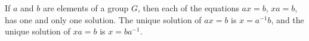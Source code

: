 If $a$ and $b$ are elements of a group $G$, then each of the equations $ax = b$, $xa = b$, has one and only one solution. The unique solution of $ax = b$ is $x = a^{-1}b$, and the unique solution of $xa = b$ is $x = ba^{-1}$.
